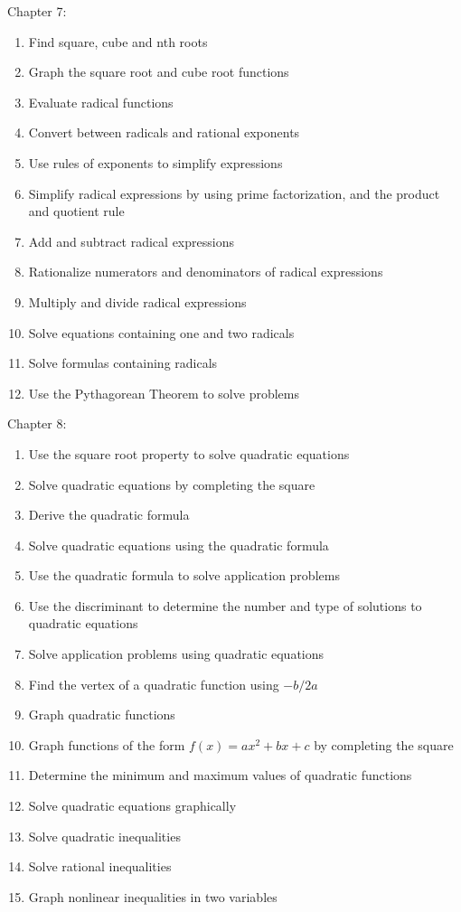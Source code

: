 \documentclass[11pt]{article}
\newenvironment{alphalist}{
\begin{enumerate}[label=(\arabic*),widest=107 ,leftmargin=25pt, itemsep=0pt]}
{\end{enumerate}}
\begin{document}
\noindent Chapter 7:
\begin{alphalist}
    \item Find square, cube and nth roots
    \item Graph the square root and cube root functions
    \item Evaluate radical functions
    \item Convert between radicals and rational exponents
    \item Use rules of exponents to simplify expressions
    \item Simplify radical expressions by using prime factorization, and the product and quotient rule
    \item Add and subtract radical expressions
    \item Rationalize numerators and denominators of radical expressions
    \item Multiply and divide radical expressions
    \item Solve equations containing one and two radicals
    \item Solve formulas containing radicals
    \item Use the Pythagorean Theorem to solve problems 
\end{alphalist}
\noindent Chapter 8:
\begin{alphalist}
    \item Use the square root property to solve quadratic equations
    \item Solve quadratic equations by completing the square
    \item Derive the quadratic formula
    \item Solve quadratic equations using the quadratic formula
    \item Use the quadratic formula to solve application problems
    \item Use the discriminant to determine the number and type of solutions to quadratic equations
    \item Solve application problems using quadratic equations
    \item Find the vertex of a quadratic function using $-b/2a$
    \item Graph quadratic functions
    \item Graph functions of the form $f(x) = ax^2 + bx + c$ by completing the square
    \item Determine the minimum and maximum values of quadratic functions
    \item Solve quadratic equations graphically
    \item Solve quadratic inequalities
    \item Solve rational inequalities
    \item Graph nonlinear inequalities in two variables
\end{alphalist}
\end{document}
